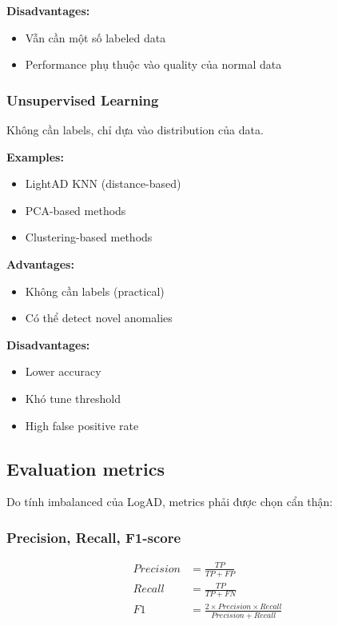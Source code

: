 \textbf{Disadvantages:}
\begin{itemize}
    \item Vẫn cần một số labeled data
    \item Performance phụ thuộc vào quality của normal data
\end{itemize}

\subsubsection{Unsupervised Learning}

Không cần labels, chỉ dựa vào distribution của data.

\textbf{Examples:}
\begin{itemize}
    \item LightAD KNN (distance-based)
    \item PCA-based methods
    \item Clustering-based methods
\end{itemize}

\textbf{Advantages:}
\begin{itemize}
    \item Không cần labels (practical)
    \item Có thể detect novel anomalies
\end{itemize}

\textbf{Disadvantages:}
\begin{itemize}
    \item Lower accuracy
    \item Khó tune threshold
    \item High false positive rate
\end{itemize}

\subsection{Evaluation metrics}

Do tính imbalanced của LogAD, metrics phải được chọn cẩn thận:

\subsubsection{Precision, Recall, F1-score}

\begin{align}
Precision &= \frac{TP}{TP + FP} \\
Recall &= \frac{TP}{TP + FN} \\
F1 &= \frac{2 \times Precision \times Recall}{Precision + Recall}
\end{align}

